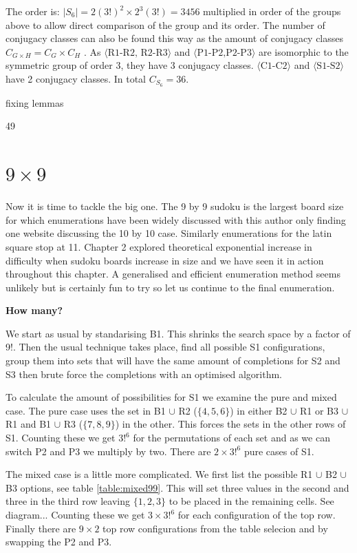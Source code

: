 \documentclass[a4paper,11pt]{report}
\newcounter{row}
\begin{document}
The order is: $|S_6|=2(3!)^2\times 2^3(3!)  =3456$ multiplied in order of the groups above to allow direct comparison of the group and its order. The number of conjugacy classes can also be found this way as the amount of conjugacy classes $C_{G\times H}= C_G \times C_H$ \cite{}. As $\langle\text{R1-R2, R2-R3}\rangle$ and $\langle\text{P1-P2,P2-P3}\rangle$ are isomorphic to the symmetric group of order 3, they have 3 conjugacy classes. $\langle\text{C1-C2}\rangle$ and $\langle\text{S1-S2}\rangle$ have 2 conjugacy classes. In total $C_{S_6}=36$.


fixing lemmas

49
	\section{$9 \times  9$}

Now it is time to tackle the big one. The 9 by 9 sudoku is the largest board size for which enumerations have been widely discussed with this author only finding one website discussing the 10 by 10 case. Similarly enumerations for the latin square stop at 11. Chapter 2 explored theoretical exponential increase in difficulty when sudoku boards increase in size and we have seen it in action throughout this chapter. A generalised and efficient enumeration method seems unlikely but is certainly fun to try so let us continue to the final enumeration.

\textbf{How many?}

We start as usual by standarising B1. This shrinks the search space by a factor of 9!. Then the usual technique takes place, find all possible S1 configurations, group them into sets that will have the same amount of completions for S2 and S3 then brute force the completions with an optimised algorithm.

To calculate the amount of possibilities for S1 we examine the pure and mixed case. The pure case uses the set  in B1 $\cup$ R2 ($\{4,5,6\}$) in either B2 $\cup$ R1 or B3 $\cup$ R1 and B1 $\cup$ R3 ($\{7,8,9\}$) in the other. This forces the sets in the other rows of S1. Counting these we get $3!^6$ for the permutations of each set and as we can switch P2 and P3 we multiply by two. There are $2\times 3!^6$ pure cases of S1. 

The mixed case is a little more complicated. We first list the possible R1 $\cup$ B2 $\cup$ B3 options, see table \ref{table:mixed99}. This will set three values in the second and three in the third row leaving $\{1,2,3\}$ to be placed in the remaining cells. See diagram... Counting these we get $3\times3!^6$ for each configuration of the top row. Finally there are $9\times 2$ top row configurations from the table selecion and by swapping the P2 and P3. 
\end{document}

